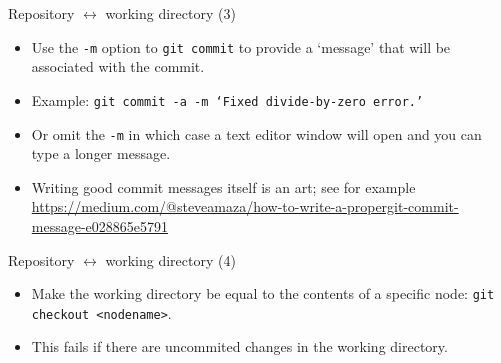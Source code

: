 \documentclass[usenames,dvipsnames]{beamer}
\newcommand{\code}[1]{\colorbox{light-gray}{\texttt{#1}}}
\begin{document}
\begin{frame}{Repository $\leftrightarrow$ working directory (3)}
  \begin{block}{}
    \begin{itemize}
      \item{Use the \code{-m} option to \code{git commit} to provide a `message' that will be associated with the commit.} 
      \item{Example: \code{git commit -a -m `Fixed divide-by-zero error.'}}
      \item{Or omit the \code{-m} in which case a text editor window will open and you can type a longer message.}
      \item{Writing good commit messages itself is an art; see for example \url{https://medium.com/@steveamaza/how-to-write-a-propergit-commit-message-e028865e5791}}
    \end{itemize}
  \end{block}
\end{frame}

\begin{frame}{Repository $\leftrightarrow$ working directory (4)}
  \begin{block}{}
    \begin{itemize}
      \item{Make the working directory be equal to the contents of a specific node: \code{git checkout <nodename>}.}
      \item{This fails if there are uncommited changes in the working directory.}
    \end{itemize}
  \end{block}
\end{frame}
\end{document}
